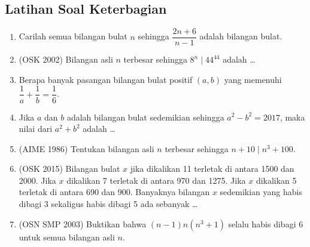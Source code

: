 \subsection{Latihan Soal Keterbagian}
\begin{enumerate}    
    \item Carilah semua bilangan bulat $n$ sehingga $\dfrac{2n+6}{n-1}$ adalah bilangan bulat.
    
    \item (OSK 2002) Bilangan asli $n$ terbesar sehingga $8^n \mid 44^{44}$ adalah \dots
    
    \item Berapa banyak pasangan bilangan bulat positif $(a,b)$ yang memenuhi $\dfrac{1}{a}+\dfrac{1}{b}=\dfrac{1}{6}$.
    
    \item Jika $a$ dan $b$ adalah bilangan bulat sedemikian sehingga $a^2-b^2=2017$, maka nilai dari $a^2+b^2$ adalah \dots
    
    \item (AIME 1986) Tentukan bilangan asli $n$ terbesar sehingga $n+10 \mid n^3+100$.

    \item (OSK 2015) Bilangan bulat $x$ jika dikalikan 11 terletak di antara 1500 dan 2000. Jika $x$ dikalikan 7 terletak di antara 970 dan 1275. Jika $x$ dikalikan 5 terletak di antara 690 dan 900. Banyaknya bilangan $x$ sedemikian yang habis dibagi 3 sekaligus habis dibagi 5 ada sebanyak \ldots

    
    \item (OSN SMP 2003) Buktikan bahwa $(n-1)n(n^3+1)$ selalu habis dibagi 6 untuk semua bilangan asli $n$.
\end{enumerate}